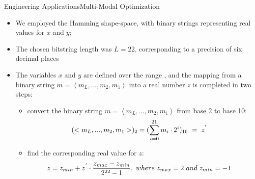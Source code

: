\begin{frame}{Engineering Applications}{Multi-Modal Optimization}
\begin{itemize}
\item{We employed the Hamming shape-space, with binary strings representing real values for \begin{math} x \end{math} and \begin{math} y \end{math};}
\item{The chosen bitstring length was \begin{math} L = 22 \end{math},  corresponding to a precision of six decimal places}
\item{The variables \begin{math} x \end{math} and \begin{math} y \end{math} are defined over the range \begin{math} [-1, 2]\end{math},  and the mapping from a binary string  \begin{math} m =\left \langle m_L,..., m_2, m_1\right\rangle\end{math} into a real number \begin{math} z \end{math} is completed in two steps:}
\begin{itemize}
    \item {convert the binary string \begin{math} m =\left \langle m_L,..., m_2, m_1\right\rangle\end{math} from base 2 to base 10:}
    \begin{equation}\small{(<m_L,..., m_2, m_1>)_2 = (\sum_{i=0}^{21}m_i \cdot 2^i)_{10} \ = \ z^{'}}
    \end{equation}
    \item{find the corresponding real value for \begin{math} z \end{math}:}
    \begin{equation}\small{z=z_{min} + z^{'} \cdot \frac{z_{max} - z_{min}}{2^{22} - 1}, \ where \ z_{max} = 2 \ and \ z_{min} = -1
    }
    \end{equation}
\end{itemize}
\end{itemize}
\end{frame}



